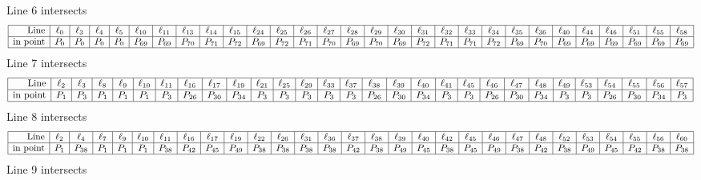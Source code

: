 \documentclass{article}
\begin{document}
{$$$$
Line 6 intersects 
$$
\begin{array}{|r*{28}{|c}|}
\hline
\mbox{Line}  & \ell_{0} & \ell_{3} & \ell_{4} & \ell_{5} & \ell_{10} & \ell_{11} & \ell_{13} & \ell_{14} & \ell_{15} & \ell_{24} & \ell_{25} & \ell_{26} & \ell_{27} & \ell_{28} & \ell_{29} & \ell_{30} & \ell_{31} & \ell_{32} & \ell_{33} & \ell_{34} & \ell_{35} & \ell_{36} & \ell_{40} & \ell_{44} & \ell_{46} & \ell_{51} & \ell_{55} & \ell_{58}\\
\hline
\mbox{in point}  & P_{0} & P_{0} & P_{0} & P_{0} & P_{69} & P_{69} & P_{70} & P_{71} & P_{72} & P_{69} & P_{72} & P_{71} & P_{70} & P_{69} & P_{70} & P_{69} & P_{72} & P_{71} & P_{71} & P_{72} & P_{69} & P_{70} & P_{69} & P_{69} & P_{69} & P_{69} & P_{69} & P_{69}\\
\hline
\end{array}
$$
Line 7 intersects 
$$
\begin{array}{|r*{28}{|c}|}
\hline
\mbox{Line}  & \ell_{2} & \ell_{3} & \ell_{8} & \ell_{9} & \ell_{10} & \ell_{11} & \ell_{16} & \ell_{17} & \ell_{19} & \ell_{21} & \ell_{25} & \ell_{29} & \ell_{33} & \ell_{37} & \ell_{38} & \ell_{39} & \ell_{40} & \ell_{41} & \ell_{45} & \ell_{46} & \ell_{47} & \ell_{48} & \ell_{49} & \ell_{53} & \ell_{54} & \ell_{55} & \ell_{56} & \ell_{57}\\
\hline
\mbox{in point}  & P_{1} & P_{3} & P_{1} & P_{1} & P_{1} & P_{3} & P_{26} & P_{30} & P_{34} & P_{3} & P_{3} & P_{3} & P_{3} & P_{3} & P_{26} & P_{30} & P_{34} & P_{3} & P_{3} & P_{26} & P_{30} & P_{34} & P_{3} & P_{3} & P_{26} & P_{30} & P_{34} & P_{3}\\
\hline
\end{array}
$$
Line 8 intersects 
$$
\begin{array}{|r*{28}{|c}|}
\hline
\mbox{Line}  & \ell_{2} & \ell_{4} & \ell_{7} & \ell_{9} & \ell_{10} & \ell_{11} & \ell_{16} & \ell_{17} & \ell_{19} & \ell_{22} & \ell_{26} & \ell_{31} & \ell_{36} & \ell_{37} & \ell_{38} & \ell_{39} & \ell_{40} & \ell_{42} & \ell_{45} & \ell_{46} & \ell_{47} & \ell_{48} & \ell_{52} & \ell_{53} & \ell_{54} & \ell_{55} & \ell_{56} & \ell_{60}\\
\hline
\mbox{in point}  & P_{1} & P_{38} & P_{1} & P_{1} & P_{1} & P_{38} & P_{42} & P_{45} & P_{49} & P_{38} & P_{38} & P_{38} & P_{38} & P_{42} & P_{38} & P_{49} & P_{45} & P_{38} & P_{45} & P_{49} & P_{38} & P_{42} & P_{38} & P_{49} & P_{45} & P_{42} & P_{38} & P_{38}\\
\hline
\end{array}
$$
Line 9 intersects 
$$
\begin{array}{|r*{28}{|c}|}

\end{array}$$}
\end{document}
